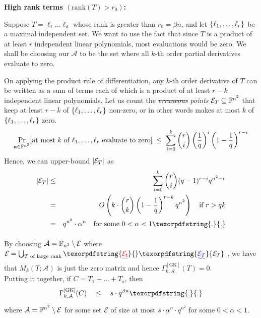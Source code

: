 \documentclass{birkjour}
\newcommand{\CM}[1]{\Gamma^{\mathrm{[#1]}}}
\providecommand{\DIFaddtex}[1]{{\protect\color{blue}\uwave{#1}}} %
\providecommand{\DIFdeltex}[1]{{\protect\color{red}\sout{#1}}}                      %
\providecommand{\DIFaddbegin}{} %
\providecommand{\DIFaddend}{} %
\providecommand{\DIFdelbegin}{} %
\providecommand{\DIFdelend}{} %
\providecommand{\DIFadd}[1]{\texorpdfstring{\DIFaddtex{#1}}{#1}} %
\providecommand{\DIFdel}[1]{\texorpdfstring{\DIFdeltex{#1}}{}} %
\begin{document}
\noindent
{\bf High rank terms $(\mathrm{rank}(T) > r_0)$:}

Suppose $T = \ell_1\dots \ell_d$ whose rank is greater than $r_0 =
\beta n$, and let $\left\{\ell_1, \dots, \ell_r\right\}$ be a maximal
independent set. We want to use the fact that since $T$ is a product
of at least $r$ independent linear polynomials, most evaluations would
be zero. We shall be choosing our $\mathcal{A}$ to be the set where
all $k$-th order partial derivatives evaluate to zero. 

On applying the product rule of differentiation, any $k$-th order 
derivative of $T$ can be written as a sum of terms each of which 
is a product of at least $r-k$ independent linear polynomials. Let us count the
\emph{\DIFdelbegin \DIFdel{erraneous }\DIFdelend \DIFaddbegin \DIFadd{erroneous }\DIFaddend points} $\mathcal{E}_T\subseteq \mathbb{F}^{n^2}$ that keep at
least $r-k$ of $\left\{\ell_1,\dots, \ell_r\right\}$ non-zero, or in other
words makes at most $k$ of $\left\{\ell_1,\dots, \ell_r\right\}$ zero.
$$
\Pr_{\mathbf{a}\in \mathbb{F}^{n^2}}[\text{at most $k$ of $\ell_1,\dots,
  \ell_r$ evaluate to zero}] \;\leq \; \sum_{i=0}^k \binom{r}{i} \left(\frac{1}{q}\right)^i\left(1 - \frac{1}{q}\right)^{r-i}
$$
Hence, we can upper-bound $\left|\mathcal{E}_T\right|$ as
\begin{eqnarray*}
\abs{\mathcal{E}_T} &\leq & \sum_{i=0}^k \binom{r}{i} (q-1)^{r-i}q^{n^2 - r}\\
 & = & O\inparen{k\cdot \binom{r}{k}\inparen{1 - \frac{1}{q}}^{r-k} q^{n^2}} \quad\text{if $r > qk$}\\
 & = & q^{n^2} \cdot \alpha^n\quad\text{for some $0< \alpha < 1$}\DIFaddbegin \DIFadd{.
 }\DIFaddend \end{eqnarray*}

 By choosing \DIFdelbegin \DIFdel{$\mathcal{A} = \mathbb{F}_{n^2} \setminus \mathcal{E}$ }\DIFdelend \DIFaddbegin \DIFadd{$\mathcal{A} = \F^{n^2} \setminus \mathcal{E}$ }\DIFaddend where
 $\mathcal{E} = \Union_{\text{$T$ of large rank}} \DIFdelbegin \DIFdel{\mathcal{E}_t}\DIFdelend \DIFaddbegin \DIFadd{\mathcal{E}_T}\DIFaddend$  , we
 have that $M_k(T;\mathcal{A})$ is just the zero matrix and hence
 $\CM{GK}_{k,\mathcal{A}}(T) = 0$.\\


Putting it together, if $C = T_1 + \dots + T_s$, then 
\begin{equation}\label{eqn:gk-upper-bound-circuit}
\CM{GK}_{k,\mathcal{A}}(C) \quad \leq \quad s \cdot
q^{\beta n}\DIFaddbegin \DIFadd{.
}\DIFaddend \end{equation} 
where $\mathcal{A} = \F^{n^2} \setminus \mathcal{E}$ for some set
$\mathcal{E}$ of size at most $s \cdot \alpha^n \cdot q^{n^2}$ for
some $0< \alpha < 1$.
\end{document}
